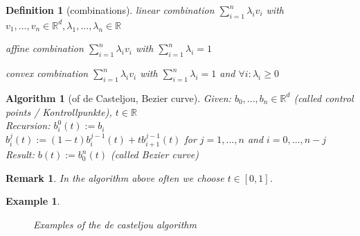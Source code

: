 \documentclass[]{article}
\newtheorem{definition}{Definition}
\newtheorem{algorithm}{Algorithm}
\newtheorem{example}{Example}
\newtheorem{remark}{Remark}
\begin{document}
\begin{definition}[combinations]
	linear combination $\sum_{i=1}^{n} \lambda_i v_i$ with $v_1,...,v_n \in \mathbb{R}^d, \lambda_1,...,\lambda_n \in \mathbb{R}$
	
	affine combination $\sum_{i=1}^{n} \lambda_i v_i$ with $\sum_{i=1}^{n} \lambda_i = 1$
	
	convex combination $\sum_{i=1}^{n} \lambda_i v_i$ with $\sum_{i=1}^{n} \lambda_i = 1$ and $\forall i: \lambda_i \geq 0$
\end{definition}

\begin{algorithm}[of de Casteljou, Bezier curve]
	Given: $b_0,...,b_n \in \mathbb{R}^d$ (called control points / Kontrollpunkte), $t \in \mathbb{R}$
	\\Recursion: $b_i^0(t) := b_i$
	\\$b_i^j(t) := (1-t)b_i^{j-1}(t) + tb_{i+1}^{j-1}(t)$ for $j=1,...,n$ and $i=0,...,n-j$
	\\Result: $b(t):=b_0^n(t)$ (called Bezier curve)
	
\end{algorithm}

\begin{remark}
	In the algorithm above often we choose $t\in[0,1]$.
\end{remark}

\begin{example}
	\begin{figure}[h!]
		\caption{Examples of the de casteljou algorithm}
		\label{fig:decasteljouexample}
\end{figure}
\end{example}
\end{document}
